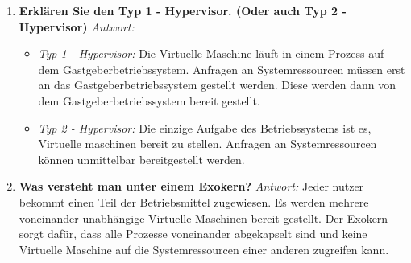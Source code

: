 \begin{enumerate}[label=\arabic*.]
    \item \textbf{Erklären Sie den Typ 1 - Hypervisor. (Oder auch Typ 2 - Hypervisor)} \newline
          \textit{Antwort:} \begin{itemize}
              \item \textit{Typ 1 - Hypervisor:} Die Virtuelle Maschine läuft in einem Prozess auf dem
                    Gastgeberbetriebssystem. Anfragen an Systemressourcen müssen erst an das Gastgeberbetriebssystem
                    gestellt werden. Diese werden dann von dem Gastgeberbetriebssystem bereit gestellt.
              \item \textit{Typ 2 - Hypervisor:} Die einzige Aufgabe des Betriebssystems ist es,
                    Virtuelle maschinen bereit zu stellen. Anfragen an Systemressourcen können unmittelbar 
                    bereitgestellt werden.
          \end{itemize}

    \item \textbf{Was versteht man unter einem Exokern?} \newline
          \textit{Antwort:} Jeder nutzer bekommt einen Teil der Betriebsmittel zugewiesen. Es werden
                    mehrere voneinander unabhängige Virtuelle Maschinen bereit gestellt. Der Exokern 
                    sorgt dafür, dass alle Prozesse voneinander abgekapselt sind und keine Virtuelle 
                    Maschine auf die Systemressourcen einer anderen zugreifen kann.

\end{enumerate}